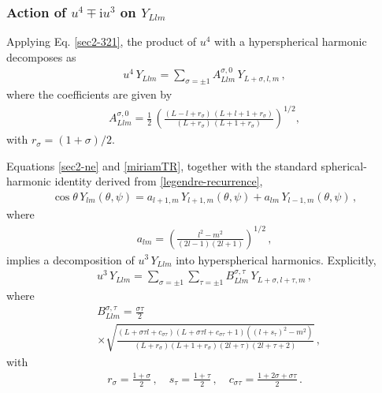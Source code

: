 \documentclass[aps,twocolumn,nofootinbib]{revtex4}
\begin{document}
{\begin{appendix}
\subsubsection{Action of $u^4 \mp \mathrm{i}u^3$ on $Y_{Llm}$}\label{sec2-60}

Applying Eq. \eqref{sec2-321}, the product of $u^4$ with a hyperspherical harmonic decomposes as
\begin{align}\label{sec2-13-1}
    u^4 \, Y_{Llm} = \sum_{\sigma=\pm 1} A^{\sigma,0}_{Llm} \, Y_{L+\sigma,l,m} \,,
\end{align}
where the coefficients are given by
\begin{align} \label{eq:coeff-A}
    A^{\sigma,0}_{Llm} = \frac{1}{2}\, \left( \frac{(L-l+r_\sigma)\, (L+l+1+r_\sigma)}{(L+r_\sigma)\, (L+1+r_\sigma)} \right)^{1/2},
\end{align}
with $r_\sigma = (1+\sigma)/2$. 

Equations \eqref{sec2-ne} and \eqref{miriamTR}, together with the standard spherical-harmonic identity derived from \eqref{legendre-recurrence},
\begin{align}\label{cos-theta-Ylm}
    \cos\theta\, Y_{lm}(\theta,\psi) = a_{l+1,m}\, Y_{l+1,m}(\theta,\psi) + a_{lm}\, Y_{l-1,m}(\theta,\psi) \,,
\end{align}
where
\begin{align}
    a_{lm} = \left( \frac{l^2-m^2}{(2l-1)(2l+1)} \right)^{1/2} \,,
\end{align}
implies a decomposition of $u^3\, Y_{Llm}$ into hyperspherical harmonics. Explicitly,
\begin{align}\label{sec2-14}
    u^3\, Y_{Llm} = \sum_{\sigma=\pm 1} \sum_{\tau=\pm 1} B^{\sigma,\tau}_{Llm}\, Y_{L+\sigma,l+\tau,m} \,,
\end{align}
where 
\begin{align} \label{eq:A-sigma-tau}
    & B^{\sigma,\tau}_{Llm} = \frac{\sigma\tau}{2} \nonumber\\
    & \times \sqrt{\frac{(L+\sigma\tau l+c_{\sigma\tau})(L+\sigma\tau l+c_{\sigma\tau}+1)\left((l+s_\tau)^2-m^2\right)}{(L+r_\sigma)(L+1+r_\sigma)(2l+\tau)(2l+\tau+2)}}\,,
\end{align}
with 
\begin{align}
    r_\sigma = \frac{1+\sigma}{2} \,, \quad s_\tau = \frac{1+\tau}{2} \,, \quad c_{\sigma\tau} = \frac{1+2\sigma+\sigma\tau}{2} \,.
\end{align}


\end{appendix}}
\end{document}
